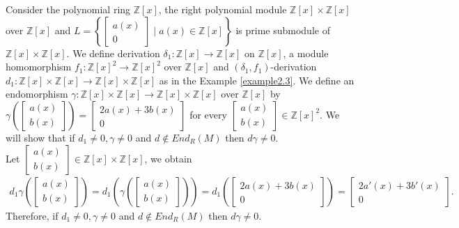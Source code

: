 \documentclass{arxiv}
\begin{document}
\begin{example}\label{example2.4}
    Consider the polynomial ring $\mathbb{Z}[x]$, the right polynomial module $\mathbb{Z}[x] \times \mathbb{Z}[x]$ over $\mathbb{Z}[x]$ and $L = \left\{ \begin{bmatrix}
        a(x)\\
        0
    \end{bmatrix} \mid a(x) \in \mathbb{Z}[x] \right\}$ is prime submodule of $\mathbb{Z}[x] \times \mathbb{Z}[x]$. We define derivation $\delta_1:\mathbb{Z}[x] \rightarrow \mathbb{Z}[x]$ on $\mathbb{Z}[x]$, a module homomorphism $f_1: \mathbb{Z}[x]^2 \rightarrow \mathbb{Z}[x]^2$ over $\mathbb{Z}[x]$ and $(\delta_1,f_1)$-derivation $d_1:\mathbb{Z}[x] \times \mathbb{Z}[x] \rightarrow \mathbb{Z}[x] \times \mathbb{Z}[x]$ as in the Example \ref{example2.3}. We define an  endomorphism $\gamma: \mathbb{Z}[x] \times \mathbb{Z}[x] \rightarrow \mathbb{Z}[x] \times \mathbb{Z}[x]$ over $\mathbb{Z}[x]$ by $\gamma \left( \begin{bmatrix}
        a(x)\\
        b(x)
    \end{bmatrix} \right) = \begin{bmatrix}
        2a(x)+3b(x)\\
        0
    \end{bmatrix}$ for every $\begin{bmatrix}
        a(x)\\
        b(x)
    \end{bmatrix} \in \mathbb{Z}[x]^2$. We will show that if $d_1 \ne 0, \gamma \ne 0$ and $d \notin End_R(M)$ then $d\gamma \ne 0$.\\
    Let $\begin{bmatrix}
        a(x)\\
        b(x)
    \end{bmatrix} \in \mathbb{Z}[x] \times \mathbb{Z}[x]$, we obtain
    \begin{align*}
        d_1\gamma \left(\begin{bmatrix}
        a(x)\\
        b(x)
    \end{bmatrix} \right) = d_1 \left( \gamma \left( \begin{bmatrix}
        a(x)\\
        b(x)
    \end{bmatrix} \right) \right) = d_1 \left( \begin{bmatrix}
        2a(x)+3b(x)\\
        0
    \end{bmatrix} \right) = \begin{bmatrix}
        2a'(x) +3b'(x)\\
        0
    \end{bmatrix}.
    \end{align*} 
    Therefore, if $d_1 \ne 0, \gamma \ne 0$ and $d \notin End_R(M)$ then $d\gamma \ne 0$.
\end{example}
\end{document}
